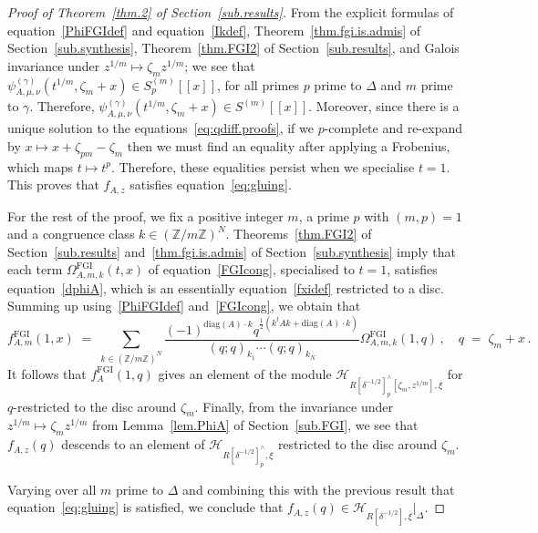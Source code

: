 \documentclass[12pt,reqno]{amsart}
\theoremstyle{definition}
\def\BZ{\mathbb Z}
\def\calH{\mathcal H}
\def\be{\begin{equation}}
\def\ee{\end{equation}}
\def\z{\zeta}
\def\={\;=\;}
\def\FGI{\mathrm{FGI}}
\def\CS{\Omega^{\FGI}}
\def\Phitof{f}
\begin{document}
\begin{proof}[Proof of Theorem~\ref{thm.2} of Section~\ref{sub.results}]
From the explicit formulas of equation~\eqref{PhiFGIdef} and
equation~\eqref{Ikdef}, Theorem~\ref{thm.fgi.is.admis} of Section~\ref{sub.synthesis},
Theorem~\ref{thm.FGI2} of Section~\ref{sub.results}, and Galois invariance under
$z^{1/m}\mapsto \z_mz^{1/m}$; we see that
$\psi^{(\gamma)}_{A,\mu,\nu}(t^{1/m},\z_m+x)\in S_p^{(m)}[\![x]\!]$,
for all primes $p$ prime to $\Delta$ and $m$ prime to $\gamma$. Therefore,
$\psi^{(\gamma)}_{A,\mu,\nu}(t^{1/m},\z_m+x)\in S^{(m)}[\![x]\!]$.
Moreover, since there is a unique solution to the equations~\eqref{eq:qdiff.proofs},
if we $p$-complete and re-expand by $x\mapsto x+\z_{pm}-\z_m$
then we must find an equality after applying a Frobenius, which maps $t\mapsto t^p$.
Therefore, these equalities persist when we specialise $t=1$.
This proves that $\Phitof_{A,z}$ satisfies equation~\eqref{eq:gluing}.

For the rest of the proof, we fix a positive integer $m$, a prime $p$ with
$(m,p)=1$ and a congruence class $k \in (\BZ/m\BZ)^N$. Theorems~\ref{thm.FGI2} of
Section~\ref{sub.results} and~\ref{thm.fgi.is.admis} of Section~\ref{sub.synthesis}
imply that each term $\CS_{A,m,k}(t,x)$ of
equation~\eqref{FGIcong}, specialised to $t=1$, satisfies equation~\eqref{dphiA},
which is an essentially equation~\eqref{fxidef} restricted to a disc. 
Summing up using~\eqref{PhiFGIdef} and~\eqref{FGIcong}, we obtain that 
\be
\Phitof_{A,m}^\FGI(1,x) \=\!\!\!\!
\sum_{k \in (\BZ/m\BZ)^N}
\frac{(-1)^{\mathrm{diag}(A)\cdot k}q^{\frac{1}{2}(k^t A k + \mathrm{diag}(A)\cdot k)}}
{(q;q)_{k_1}\cdots(q;q)_{k_N}}\CS_{A,m,k}(1,q)\,,\quad q\=\z_{m}+x \,.
\ee
It follows that $\Phitof_{A}^\FGI(1,q)$ gives an element of the
module $\calH_{R[\delta^{-1/2}]^\wedge_p[\z_m,z^{1/m}],\xi}$ for $q$-restricted
to the disc around $\z_m$.
Finally, from the invariance under $z^{1/m}\mapsto\z_m z^{1/m}$ from
Lemma~\ref{lem.PhiA} of Section~\ref{sub.FGI}, we see that $\Phitof_{A,z}(q)$
descends to an element of $\calH_{R[\delta^{-1/2}]^\wedge_p,\xi}$ restricted to
the disc around $\z_m$.

Varying over all $m$ prime to $\Delta$ and combining this with the previous
result that equation~\eqref{eq:gluing} is satisfied, we conclude that
$\Phitof_{A,z}(q)\in\calH_{R[\delta^{-1/2}],\xi}|_\Delta$.
\end{proof}
\end{document}

